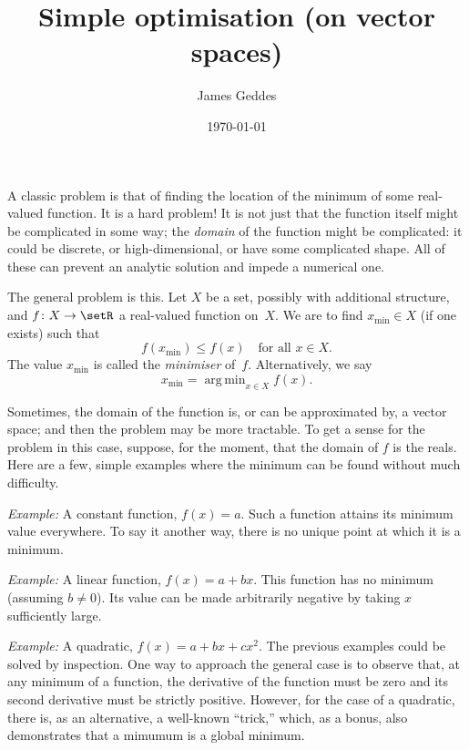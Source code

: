 \documentclass[10pt, a4paper]{article}
\title{Simple optimisation (on vector spaces)}
\author{James Geddes}
\date{\today}
\DeclareMathOperator*{\argmin}{arg\,min}
\newcommand{\eg}{\emph{Example:}}
\begin{document}
\maketitle

A classic problem is that of finding the location of the minimum of
some real-valued function. It is a hard problem! It is not just that
the function itself might be complicated in some way; the
\emph{domain} of the function might be complicated: it could be
discrete, or high-dimensional, or have some complicated shape. All of
these can prevent an analytic solution and impede a numerical one.

The general problem is this. Let $X$ be a set, possibly with
additional structure, and $f\colon X \to \setR$ a real-valued function
on~$X$. We are to find $x_\text{min}\in X$ (if one exists) such that
\[
 f(x_\text{min}) \leq f(x) \quad\text{for all $x\in X$}.  
\]
The value $x_\text{min}$ is called the \emph{minimiser}
of~$f$. Alternatively, we say
\begin{equation}
  x_\text{min} = \argmin_{x\in X} f(x).
\label{eq:argmin}
\end{equation}

Sometimes, the domain of the function is, or can be approximated by, a
vector space; and then the problem may be more tractable. To get a
sense for the problem in this case, suppose, for the moment, that the
domain of $f$ is the reals. Here are a few, simple examples where the
minimum can be found without much difficulty.

\eg{} A constant function, $f(x) = a$. Such a function attains its
minimum value everywhere. To say it another way, there is no unique
point at which it is a minimum.

\eg{} A linear function, $f(x) = a + bx$. This
function has no minimum (assuming $b\neq0$). Its value can be made
arbitrarily negative by taking $x$ sufficiently large.

\eg{} A quadratic, $f(x) = a + bx + cx^2$. The previous examples could
be solved by inspection. One way to approach the general case is to
observe that, at any minimum of a function, the derivative of the
function must be zero and its second derivative must be strictly
positive.
However, for the case of a quadratic, there is, as an alternative, a
well-known “trick,” which, as a bonus, also demonstrates that a
mimumum is a global minimum.
\end{document}
